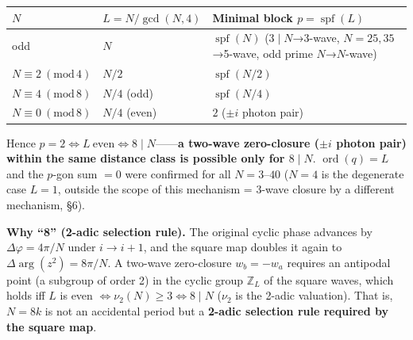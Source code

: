 \documentclass[
  a4paper,
]{ltjsarticle}
\newcounter{none} %
\begin{document}
{\def\LTcaptype{none} %
\begin{longtable}[]{@{}
  >{\raggedright\arraybackslash}p{}
  >{\raggedright\arraybackslash}p{}
  >{\raggedright\arraybackslash}p{}@{}}
\toprule\noalign{}
\begin{minipage}[b]{\linewidth}\raggedright
\(N\)
\end{minipage} & \begin{minipage}[b]{\linewidth}\raggedright
\(L=N/\gcd(N,4)\)
\end{minipage} & \begin{minipage}[b]{\linewidth}\raggedright
Minimal block \(p=\operatorname{spf}(L)\)
\end{minipage} \\
\midrule\noalign{}
\endhead
\bottomrule\noalign{}
\endlastfoot
odd & \(N\) & \(\operatorname{spf}(N)\) (\(3\mid N\)→3-wave,
\(N=25,35\)→5-wave, odd prime \(N\)→\(N\)-wave) \\
\(N\equiv2\ (\mathrm{mod}\,4)\) & \(N/2\) &
\(\operatorname{spf}(N/2)\) \\
\(N\equiv4\ (\mathrm{mod}\,8)\) & \(N/4\) (odd) &
\(\operatorname{spf}(N/4)\) \\
\(N\equiv0\ (\mathrm{mod}\,8)\) & \(N/4\) (even) & \(2\) (\(\pm i\)
photon pair) \\
\end{longtable}
}

Hence \(\boxed{p=2\iff L\ \text{even}\iff 8\mid N}\)------\textbf{a
two-wave zero-closure (\(\pm i\) photon pair) within the same distance
class is possible only for \(8\mid N\)}. \(\operatorname{ord}(q)=L\) and
the \(p\)-gon sum \(=0\) were confirmed for all \(N=3\)--\(40\) (\(N=4\)
is the degenerate case \(L=1\), outside the scope of this mechanism =
3-wave closure by a different mechanism, §6).

\textbf{Why ``8'' (2-adic selection rule).} The original cyclic phase
advances by \(\Delta\varphi=4\pi/N\) under \(i\to i+1\), and the square
map doubles it again to \(\Delta\arg(z^2)=8\pi/N\). A two-wave
zero-closure \(w_b=-w_a\) requires an antipodal point (a subgroup of
order 2) in the cyclic group \(\mathbb Z_L\) of the square waves, which
holds iff \(L\) is even \(\iff\nu_2(N)\ge3\iff 8\mid N\) (\(\nu_2\) is
the 2-adic valuation). That is, \(N=8k\) is not an accidental period but
a \textbf{2-adic selection rule required by the square map}.
\end{document}

